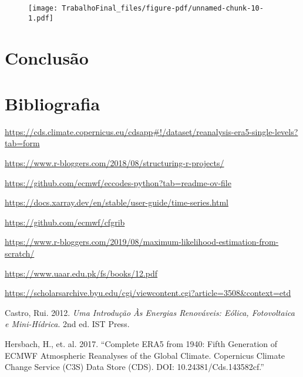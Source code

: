 \documentclass[
  letterpaper,
  DIV=11,
  numbers=noendperiod]{scrartcl}
\newlength{\cslhangindent}
\newlength{\cslentryspacingunit} %
\newenvironment{CSLReferences}[2] %
 {%
  \setlength{\parindent}{0pt}
  \ifodd #1
  \let\oldpar\par
  \def\par{\hangindent=\cslhangindent\oldpar}
  \fi
  \setlength{\parskip}{#2\cslentryspacingunit}
 }%
 {}
\begin{document}
\begin{figure}[H]

{\centering \texttt{[image: TrabalhoFinal\_files/figure-pdf/unnamed-chunk-10-1.pdf]}

}

\end{figure}

\hypertarget{conclusuxe3o}{%
\section{Conclusão}\label{conclusuxe3o}}

\hypertarget{bibliografia}{%
\section{Bibliografia}\label{bibliografia}}

\url{https://cds.climate.copernicus.eu/cdsapp\#!/dataset/reanalysis-era5-single-levels?tab=form}

\url{https://www.r-bloggers.com/2018/08/structuring-r-projects/}

\url{https://github.com/ecmwf/eccodes-python?tab=readme-ov-file}

\url{https://docs.xarray.dev/en/stable/user-guide/time-series.html}

\url{https://github.com/ecmwf/cfgrib}

\url{https://www.r-bloggers.com/2019/08/maximum-likelihood-estimation-from-scratch/}

\url{https://www.uaar.edu.pk/fs/books/12.pdf}

\url{https://scholarsarchive.byu.edu/cgi/viewcontent.cgi?article=3508\&context=etd}

\hypertarget{refs}{}
\begin{CSLReferences}{1}{0}
\leavevmode{}%
Castro, Rui. 2012. \emph{Uma Introdução Às Energias Renováveis: Eólica,
Fotovoltaica e Mini-Hídrica}. 2nd ed. IST Press.

\leavevmode{}%
Hersbach, H., et. al. 2017. {``Complete ERA5 from 1940: Fifth Generation
of ECMWF Atmospheric Reanalyses of the Global Climate. Copernicus
Climate Change Service (C3S) Data Store (CDS). DOI:
10.24381/Cds.143582cf.''}

\end{CSLReferences}
\end{document}
